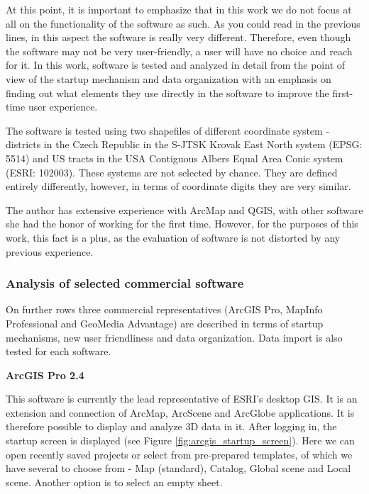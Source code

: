 \documentclass[a4paper,10pt,twoside]{article}
\begin{document}
\noindent At this point, it is important to emphasize that in this work we do not focus at all on the functionality of the software as such. As you could read in the previous lines, in this aspect the software is really very different. Therefore, even though the software may not be very user-friendly, a user will have no choice and reach for it. In this work, software is tested and analyzed in detail from the point of view of the startup mechanism and data organization with an emphasis on finding out what elements they use directly in the software to improve the first-time user experience.

The software is tested using two shapefiles of different coordinate system - districts in the Czech Republic in the S-JTSK Krovak East North system (EPSG: 5514) and US tracts in the USA Contiguous Albers Equal Area Conic system (ESRI: 102003). These systems are not selected by chance. They are defined entirely differently, however, in terms of coordinate digits they are very similar.

The author has extensive experience with ArcMap and QGIS, with other software she had the honor of working for the first time. However, for the purposes of this work, this fact is a plus, as the evaluation of software is not distorted by any previous experience.

\newpage
\vspace*{-1cm}
\subsubsection{Analysis of selected commercial software}

\noindent On further rows three commercial representatives (ArcGIS Pro, MapInfo Professional and GeoMedia Advantage) are described in terms of startup mechanisms, new user friendliness and data organization. Data import is also tested for each software. 

\bigskip

\noindent \textbf {ArcGIS Pro 2.4}

\noindent This software is currently the lead representative of ESRI's desktop GIS. It is an extension and connection of ArcMap, ArcScene and ArcGlobe applications. It is therefore possible to display and analyze 3D data in it. After logging in, the startup screen is displayed (see Figure \ref{fig:arcgis_startup_screen}). Here we can open recently saved projects or select from pre-prepared templates, of which we have several to choose from - Map (standard), Catalog, Global scene and Local scene. Another option is to select an empty sheet.
\end{document}
